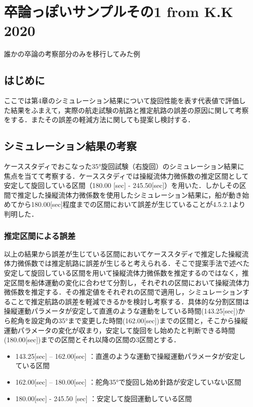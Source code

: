 \chapter{卒論っぽいサンプルその1 from K.K 2020}

誰かの卒論の考察部分のみを移行してみた例

\section{はじめに}
ここでは第4章のシミュレーション結果について旋回性能を表す代表値で評価した結果をふまえて，実際の航走試験の航路と推定航路の誤差の原因に関して考察をする．またその誤差の軽減方法に関しても提案し検討する． 

\section{シミュレーション結果の考察}
ケーススタディでおこなった35°旋回試験（右旋回）のシミュレーション結果に焦点を当てて考察する．ケーススタディでは操縦流体力微係数の推定区間として安定して旋回している区間（180.00 [sec] - 245.50[sec]）を用いた．しかしその区間で推定した操縦流体力微係数を使用したシミュレーション結果に，船が動き始めてから180.00[sec]程度までの区間において誤差が生じていることが4.5.2.1より判明した．

\subsection{推定区間による誤差}
以上の結果から誤差が生じている区間においてケーススタディで推定した操縦流体力微係数では推定航路に誤差が生じると考えられる．そこで提案手法で述べた安定して旋回している区間を用いて操縦流体力微係数を推定するのではなく，推定区間を船体運動の変化に合わせて分割し，それぞれの区間において操縦流体力微係数を推定する．その推定値をそれぞれの区間で適用し，シミュレーションすることで推定航路の誤差を軽減できるかを検討し考察する．具体的な分割区間は操縦運動パラメータが安定して直進のような運動をしている時間(143.25[sec])から舵角を設定角の35°まで変更した時間(162.00[sec])までの区間と，そこから操縦運動パラメータの変化が収まり，安定して旋回をし始めたと判断できる時間 (180.00[sec])までの区間とそれ以降の区間の3区間とする．

\begin{itemize}
	\item 143.25[sec] – 162.00[sec] ：直進のような運動で操縦運動パラメータが安定している区間
	\item 	162.00[sec] – 180.00[sec] ：舵角35°で旋回し始め針路が安定していない区間
	\item 180.00[sec] - 245.50 [sec] ：安定して旋回運動している区間
\end{itemize}

